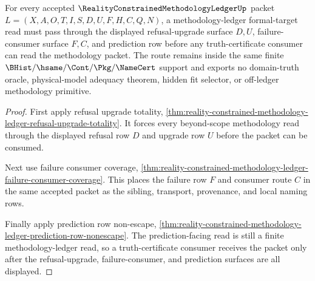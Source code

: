 \begin{theorem}
\label{thm:reality-constrained-methodology-ledger-formal-target-route-totality}
For every accepted $\RealityConstrainedMethodologyLedgerUp$ packet
$L=(X,A,O,T,I,S,D,U,F,H,C,Q,N)$, a methodology-ledger formal-target read must
pass through the displayed refusal-upgrade surface $D,U$, failure-consumer
surface $F,C$, and prediction row before any truth-certificate consumer can read
the methodology packet. The route remains inside the same finite
$\BHist/\hsame/\Cont/\Pkg/\NameCert$ support and exports no domain-truth oracle,
physical-model adequacy theorem, hidden fit selector, or off-ledger methodology
primitive.
\end{theorem}
\begin{proof}
First apply refusal upgrade totality,
\autoref{thm:reality-constrained-methodology-ledger-refusal-upgrade-totality}.
It forces every beyond-scope methodology read through the displayed refusal row
$D$ and upgrade row $U$ before the packet can be consumed.

Next use failure consumer coverage,
\autoref{thm:reality-constrained-methodology-ledger-failure-consumer-coverage}.
This places the failure row $F$ and consumer route $C$ in the same accepted
packet as the sibling, transport, provenance, and local naming rows.

Finally apply prediction row non-escape,
\autoref{thm:reality-constrained-methodology-ledger-prediction-row-nonescape}.
The prediction-facing read is still a finite methodology-ledger read, so a
truth-certificate consumer receives the packet only after the refusal-upgrade,
failure-consumer, and prediction surfaces are all displayed.
\end{proof}
